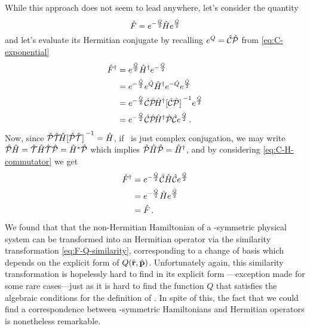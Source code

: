             While this approach does not seem to lead anywhere, let's consider the quantity
            \begin{equation}
                \label{eq:F-Q-similarity}
                \hat{F} = e^{-\frac{\hat{Q}}{2}}\!\hat{H}e^{\frac{\hat{Q}}{2}}
            \end{equation}
            and let's evaluate its Hermitian conjugate by recalling $e^{Q} = \mathcal{\hat{C}}\mathcal{\hat{P}}$ from \eqref{eq:C-exponential}
            \begin{align*}
                \hF^\dag
                &= \myexp{\frac{\hQ}{2}} \hH^\dag \myexp{-\frac{\hQ}{2}} \\
                &= \myexp{-\frac{\hQ}{2}} \myexp{\hQ} \hH^\dag \myexp{-\hQ} \myexp{\frac{\hQ}{2}} \\
                &= \myexp{-\frac{\hQ}{2}} \hC\hP\! \hH^\dag \bqty*{\hC\hP}^{-1} \myexp{\frac{\hQ}{2}} \\
                &= \myexp{-\frac{\hQ}{2}} \hC\hP\! \hH^\dag \hP\hC \myexp{\frac{\hQ}{2}}
                \myperiod
            \end{align*}
            Now, since $\PTtransform{\hH} = \hH$, if \hT\ is just complex conjugation, we may write $\mathcal{\hat{P}}\hat{H} = \mathcal{\hat{T}}\hat{H}\mathcal{\hat{T}}\mathcal{\hat{P}} = \hat{H}^*\mathcal{\hat{P}}$ which implies $\mathcal{\hat{P}}\hat{H}\mathcal{\hat{P}} = \hat{H}^\dag$, and by considering \eqref{eq:C-H-commutator} we get \cite{bender2024}
            \begin{align*}
                \hat{F}^\dag 
                &= e^{-\frac{\hat{Q}}{2}} \mathcal{\hat{C}} \hat{H} \mathcal{\hat{C}} e^{\frac{\hat{Q}}{2}} \\
                &= e^{-\frac{\hat{Q}}{2}} \hat{H} e^{\frac{\hat{Q}}{2}} \\
                &= \hat{F}
                \,\text{.}
            \end{align*}
            We found that that the non-Hermitian Hamiltonian of a \PT-symmetric physical system can be transformed into an Hermitian operator via the similarity transformation \eqref{eq:F-Q-similarity}, corresponding to a change of basis which depends on the explicit form of $Q\pqty{\hvr,\hvp}$. Unfortunately again, this similarity transformation is hopelessly hard to find in its explicit form \cite{bender2024}---exception made for some rare cases---just as it is hard to find the function $Q$ that satisfies the algebraic conditions for the definition of \hC. In spite of this, the fact that we could find a correspondence between \PT-symmetric Hamiltonians and Hermitian operators is nonetheless remarkable.
            
